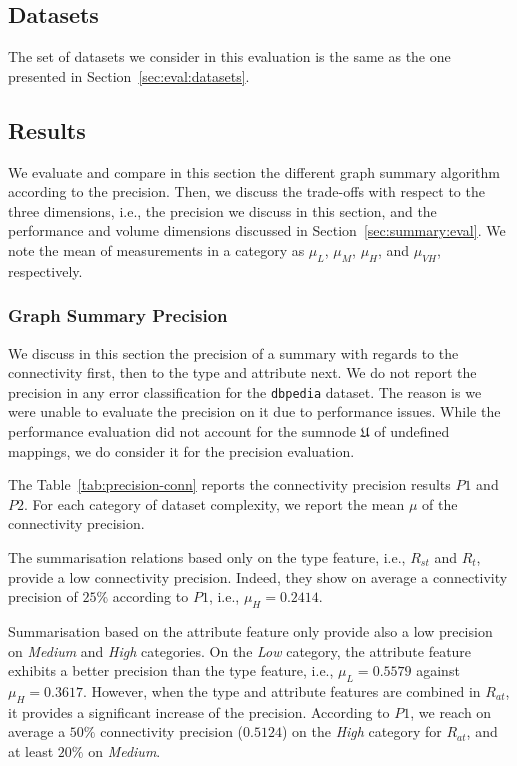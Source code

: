 \subsection{Datasets}

The set of datasets we consider in this evaluation is the same as the one presented in Section~\ref{sec:eval:datasets}.

\subsection{Results}

We evaluate and compare in this section the different graph summary algorithm according to the precision. Then, we discuss the trade-offs with respect to the three dimensions, i.e., the precision we discuss in this section, and the performance and volume dimensions discussed in Section~\ref{sec:summary:eval}.
We note the mean of measurements in a category as $\mu_{L}$, $\mu_{M}$, $\mu_{H}$, and $\mu_{VH}$, respectively.

\subsubsection{Graph Summary Precision}

We discuss in this section the precision of a summary with regards to the connectivity first, then to the type and attribute next. We do not report the precision in any error classification for the \texttt{dbpedia} dataset. The reason is we were unable to evaluate the precision on it due to performance issues. While the performance evaluation did not account for the sumnode $\mathfrak{U}$ of undefined mappings, we do consider it for the precision evaluation.


The Table~\ref{tab:precision-conn} reports the connectivity precision results $P1$ and $P2$. For each category of dataset complexity, we report the mean $\mu$ of the connectivity precision.

The summarisation relations based only on the type feature, i.e., $R_{st}$ and $R_t$, provide a low connectivity precision. Indeed, they show on average a connectivity precision of $25\%$ according to $P1$, i.e., $\mu_H=0.2414$.

Summarisation based on the attribute feature only provide also a low precision on \emph{Medium} and \emph{High} categories. On the \emph{Low} category, the attribute feature exhibits a better precision than the type feature, i.e., $\mu_L=0.5579$ against $\mu_H=0.3617$. However, when the type and attribute features are combined in $R_{at}$, it provides a significant increase of the precision. According to $P1$, we reach on average a $50\%$ connectivity precision ($0.5124$) on the \emph{High} category for $R_{at}$, and at least $20\%$ on \emph{Medium}.

